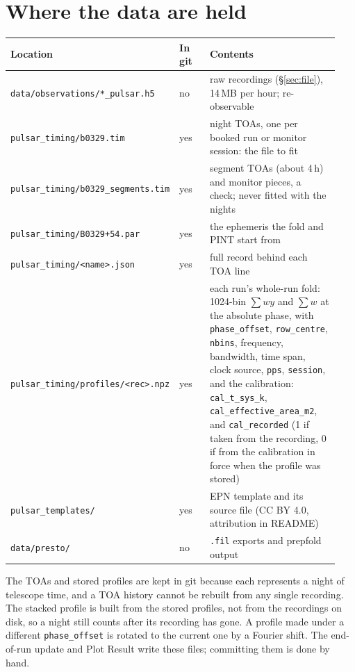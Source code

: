 \documentclass[11pt,a4paper]{article}
\newcommand{\code}[1]{\texttt{#1}}
\begin{document}
\section{Where the data are held}
\begin{longtable}{@{}p{0.38\linewidth}p{0.12\linewidth}p{0.44\linewidth}@{}}
\toprule
Location & In git & Contents \\
\midrule
\code{data/observations/*\_pulsar.h5} & no & raw recordings (\S\ref{sec:file}), 14\,MB per hour; re-observable \\
\code{pulsar\_timing/b0329.tim} & yes & night TOAs, one per booked run or monitor session: the file to fit \\
\code{pulsar\_timing/b0329\_segments.tim} & yes & segment TOAs (about 4\,h) and monitor pieces, a check; never fitted with the nights \\
\code{pulsar\_timing/B0329+54.par} & yes & the ephemeris the fold and PINT start from \\
\code{pulsar\_timing/<name>.json} & yes & full record behind each TOA line \\
\code{pulsar\_timing/profiles/<rec>.npz} & yes & each run's whole-run fold: 1024-bin $\sum wy$ and $\sum w$ at the absolute phase, with \code{phase\_offset}, \code{row\_centre}, \code{nbins}, frequency, bandwidth, time span, clock source, \code{pps}, \code{session}, and the calibration: \code{cal\_t\_sys\_k}, \code{cal\_effective\_area\_m2}, and \code{cal\_recorded} (1 if taken from the recording, 0 if from the calibration in force when the profile was stored) \\
\code{pulsar\_templates/} & yes & EPN template and its source file (CC BY 4.0, attribution in README) \\
\code{data/presto/} & no & \code{.fil} exports and prepfold output \\
\bottomrule
\end{longtable}

The TOAs and stored profiles are kept in git because each represents a night of telescope time, and a TOA history cannot be rebuilt from any single recording. The stacked profile is built from the stored profiles, not from the recordings on disk, so a night still counts after its recording has gone. A profile made under a different \code{phase\_offset} is rotated to the current one by a Fourier shift. The end-of-run update and Plot Result write these files; committing them is done by hand.
\end{document}
